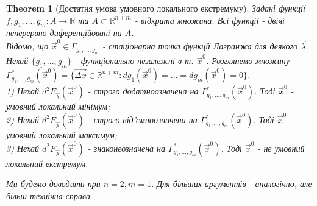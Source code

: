 \documentclass[a4paper, 10pt]{article}
\theoremstyle{theoremdd}
\newtheorem{theorem}{Theorem}[subsection]
\theoremstyle{theoremdd}
\theoremstyle{theoremdd}
\theoremstyle{theoremdd}
\theoremstyle{theoremdd}
\theoremstyle{theoremdd}
\theoremstyle{theoremdd}
\theoremstyle{theoremdd}
\theoremstyle{theoremdd}
\begin{document}
\begin{theorem}[Достатня умова умовного локального екстремуму]
Задані функції $f,g_1,\dots,g_m: A \to \mathbb{R}$ та $A \subset \mathbb{R}^{n+m}$ - відкрита множина. Всі функції - двічі неперервно диференційовані на $A$.\\
Відомо, що $\vec{x}^0 \in \Gamma_{g_1,\dots,g_m}$ - стаціонарна точка функції Лагранжа для деякого $\vec{\lambda}$. Нехай $\{g_1,\dots,g_m\}$ - функціонально незалежні в т. $\vec{x}^0$. Розглянемо множину $\Gamma^*_{g_1,\dots,g_m}(\vec{x}^0) = \{ \vec{\Delta x} \in \mathbb{R}^{n+m}: dg_1(\vec{x}^0) = \dots = dg_m(\vec{x}^0) = 0 \}$.\\
1) Нехай $d^2 F_{\vec{\lambda}}(\vec{x}^0)$ - строго додатноозначена на $\Gamma^*_{g_1,\dots,g_m}(\vec{x}^0)$. Тоді $\vec{x}^0$ - умовний локальний мінімум;\\
2) Нехай $d^2 F_{\vec{\lambda}}(\vec{x}^0)$ - строго від'ємноозначена на $\Gamma^*_{g_1,\dots,g_m}(\vec{x}^0)$. Тоді $\vec{x}^0$ - умовний локальний максимум;\\
3) Нехай $d^2 F_{\vec{\lambda}}(\vec{x}^0)$ - знаконеозначена на $\Gamma^*_{g_1,\dots,g_m}(\vec{x}^0)$. Тоді $\vec{x}^0$ - не умовний локальний екстремум.
\end{theorem}

\textit{Ми будемо доводити при $n = 2, m = 1$. Для більших аргументів - аналогічно, але більш технічна справа}
\end{document}
